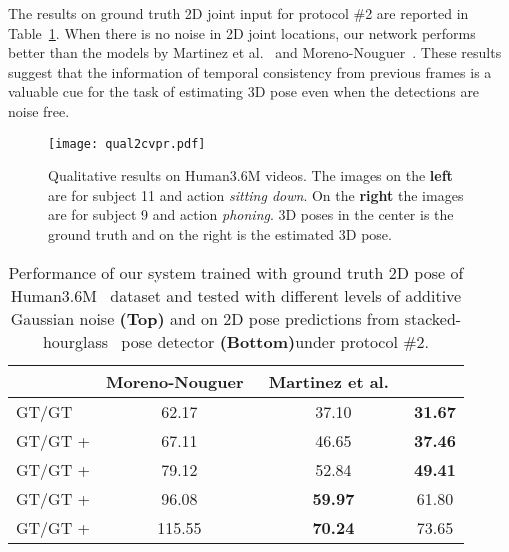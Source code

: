 \documentclass[runningheads]{llncs}
\begin{document}
The results on ground truth 2D joint input for protocol \#2 are reported in Table~\ref{tab:roubst_gt}. When there is no noise in 2D joint locations, our network performs better than the models by Martinez et al.~\cite{JMartinez:ICCV:2017} and Moreno-Nouguer~\cite{distance-matrix}. These results suggest that the information of temporal consistency from previous frames is a valuable cue for the task of estimating 3D pose even when the detections are noise free.
\begin{figure*}[t]
\begin{center}
\texttt{[image: qual2cvpr.pdf]}
\end{center}
\caption{Qualitative results on Human3.6M videos. The images on the \textbf{left} are for subject 11 and action \emph{sitting down}. On the \textbf{right} the images are for subject 9 and action \emph{phoning}. 3D poses in the center is the ground truth and on the right is the estimated 3D pose.}
\vspace{-5mm}
\label{fig:qualt2}  
\end{figure*}

\begin{table}
\begin{center}
\tabcolsep=1mm
\scalebox{0.70}
{\begin{tabular}{@{}lccc@{}}
\hline
 & Moreno-Nouguer~\cite{distance-matrix} & Martinez et al.~\cite{JMartinez:ICCV:2017}& \\
\hline
GT/GT                       & 62.17 & 37.10 & \textbf{31.67}\\
GT/GT +   & 67.11  & 46.65 & \textbf{37.46}\\
GT/GT +  & 79.12 & 52.84 & \textbf{49.41}\\
GT/GT +  & 96.08 & \textbf{59.97} & 61.80\\
GT/GT +  & 115.55 & \textbf{70.24} & 73.65\\
\hline
\end{tabular}}
\end{center}
\caption{Performance of our system trained with ground truth 2D pose of Human3.6M~\cite{h36m_pami} dataset and tested with different levels of additive Gaussian noise \textbf{(Top)} and on 2D pose predictions from stacked-hourglass~\cite{stacked-hourglass} pose detector \textbf{(Bottom)}under protocol \#2.} 
\vspace{-5mm}
\label{tab:roubst_gt}
\end{table}
\vspace{-7mm}
\end{document}
